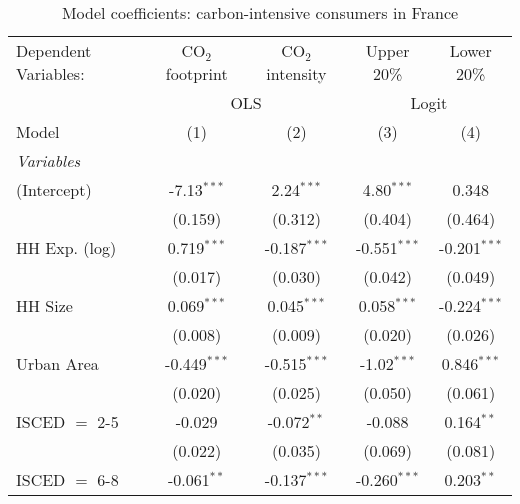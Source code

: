
\begin{table}[htbp!]
   \centering
   \small
   \begin{adjustbox}{width = 1\textwidth, max height = 0.95\textheight, center}
      \begin{threeparttable}[b]
         \caption{\label{tab:Logit_1_FRA} Model coefficients: carbon-intensive consumers in France}
         \begin{tabular}{lcccc}
            \tabularnewline \midrule \midrule
            Dependent Variables: & CO$_{2}$ footprint & CO$_{2}$ intensity & Upper 20\%     & Lower 20\%\\   
             & \multicolumn{2}{c}{OLS} & \multicolumn{2}{c}{Logit} \\ 
            Model                & (1)                & (2)                & (3)            & (4)\\  
            \midrule
            \emph{Variables}\\
            (Intercept)          & -7.13$^{***}$      & 2.24$^{***}$       & 4.80$^{***}$   & 0.348\\   
                                 & (0.159)            & (0.312)            & (0.404)        & (0.464)\\   
            HH Exp. (log)        & 0.719$^{***}$      & -0.187$^{***}$     & -0.551$^{***}$ & -0.201$^{***}$\\   
                                 & (0.017)            & (0.030)            & (0.042)        & (0.049)\\   
            HH Size              & 0.069$^{***}$      & 0.045$^{***}$      & 0.058$^{***}$  & -0.224$^{***}$\\   
                                 & (0.008)            & (0.009)            & (0.020)        & (0.026)\\   
            Urban Area           & -0.449$^{***}$     & -0.515$^{***}$     & -1.02$^{***}$  & 0.846$^{***}$\\   
                                 & (0.020)            & (0.025)            & (0.050)        & (0.061)\\   
            ISCED $=$ 2-5        & -0.029             & -0.072$^{**}$      & -0.088         & 0.164$^{**}$\\   
                                 & (0.022)            & (0.035)            & (0.069)        & (0.081)\\   
            ISCED $=$ 6-8        & -0.061$^{**}$      & -0.137$^{***}$     & -0.260$^{***}$ & 0.203$^{**}$\\   

\end{tabular}
\end{threeparttable}
\end{adjustbox}
\end{table}

